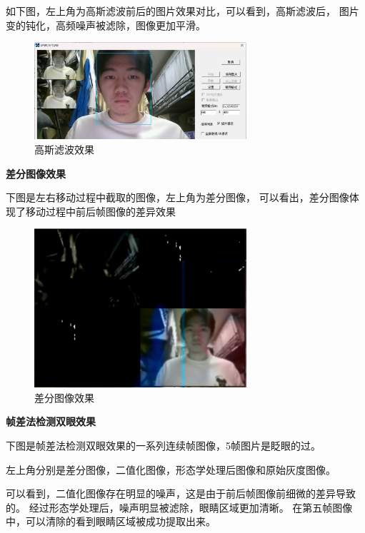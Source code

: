 \documentclass[12pt,hyperref,a4paper,UTF8]{ctexart}
\begin{document}
        如下图，左上角为高斯滤波前后的图片效果对比，可以看到，高斯滤波后，
        图片变的钝化，高频噪声被滤除，图像更加平滑。
        \begin{figure}[H]
            \centering
            \includegraphics[width=0.7\textwidth]{./figures/fig/image18.png}
            \caption{高斯滤波效果}
            \label{fig:example}
        \end{figure}

        \large \textbf{差分图像效果}

        下图是左右移动过程中截取的图像，左上角为差分图像，
        可以看出，差分图像体现了移动过程中前后帧图像的差异效果
        \begin{figure}[H]
            \centering
            \includegraphics[width=0.7\textwidth]{./figures/fig/image19.png}
            \caption{差分图像效果}
            \label{fig:example}
        \end{figure}



        \large \textbf{帧差法检测双眼效果}

        下图是帧差法检测双眼效果的一系列连续帧图像，5帧图片是眨眼的过。
        
        左上角分别是差分图像，二值化图像，形态学处理后图像和原始灰度图像。

        可以看到，二值化图像存在明显的噪声，这是由于前后帧图像前细微的差异导致的。
        经过形态学处理后，噪声明显被滤除，眼睛区域更加清晰。
        在第五帧图像中，可以清除的看到眼睛区域被成功提取出来。
\end{document}
